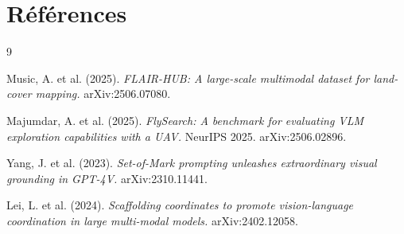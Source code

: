 \documentclass[a4paper, 11pt, french]{article}
\begin{document}
\section{Références}

\begin{thebibliography}{9}

  Music, A. et al. (2025).
  \emph{FLAIR-HUB: A large-scale multimodal dataset for land-cover
  mapping.}
  arXiv:2506.07080.

  Majumdar, A. et al. (2025).
  \emph{FlySearch: A benchmark for evaluating VLM exploration
  capabilities with a UAV.}
  NeurIPS 2025. arXiv:2506.02896.

  Yang, J. et al. (2023).
  \emph{Set-of-Mark prompting unleashes extraordinary visual grounding
  in GPT-4V.}
  arXiv:2310.11441.

  Lei, L. et al. (2024).
  \emph{Scaffolding coordinates to promote vision-language coordination
  in large multi-modal models.}
  arXiv:2402.12058.

\end{thebibliography}
\end{document}
